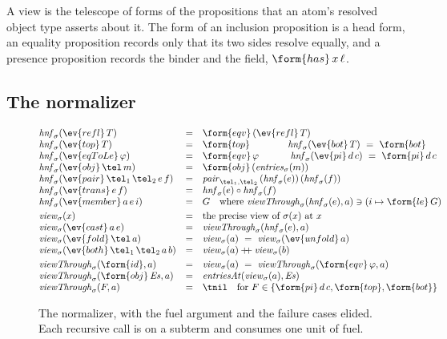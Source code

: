 A view is the telescope of forms of the propositions that an atom's resolved object type asserts about it. The form of an inclusion proposition is a head form, an equality proposition records only that its two sides resolve equally, and a presence proposition records the binder and the field, $\form{has}\,x\,\ell$.

\subsection{The normalizer}\label{sec:normalizer}

\begin{figure}
\small
\[
\begin{array}{@{}lcl@{}}
\mathit{hnf}_\sigma(\ev{refl}\,T) & = & \form{eqv}\,(\ev{refl}\,T) \\
\mathit{hnf}_\sigma(\ev{top}\,T) & = & \form{top} \qquad\qquad \mathit{hnf}_\sigma(\ev{bot}\,T) \ =\ \form{bot} \\
\mathit{hnf}_\sigma(\ev{eqToLe}\,\varphi) & = & \form{eqv}\,\varphi \qquad\quad\ \mathit{hnf}_\sigma(\ev{pi}\,d\,c) \ =\ \form{pi}\,d\,c \\
\mathit{hnf}_\sigma(\ev{obj}\,\tel\,m) & = & \form{obj}\,(\mathit{entries}_\sigma(m)) \\
\mathit{hnf}_\sigma(\ev{pair}\,\tel_1\,\tel_2\,e\,f) & = & \mathit{pair}_{\tel_1,\tel_2}\,(\mathit{hnf}_\sigma(e))\,(\mathit{hnf}_\sigma(f)) \\
\mathit{hnf}_\sigma(\ev{trans}\,e\,f) & = & \mathit{hnf}_\sigma(e) \circ \mathit{hnf}_\sigma(f) \\
\mathit{hnf}_\sigma(\ev{member}\,a\,e\,i) & = & G \quad \text{where } \mathit{viewThrough}_\sigma(\mathit{hnf}_\sigma(e), a) \ni (i \mapsto \form{le}\,G) \\[3pt]
\mathit{view}_\sigma(x) & = & \text{the precise view of } \sigma(x) \text{ at } x \\
\mathit{view}_\sigma(\ev{cast}\,a\,e) & = & \mathit{viewThrough}_\sigma(\mathit{hnf}_\sigma(e), a) \\
\mathit{view}_\sigma(\ev{fold}\,\tel\,a) & = & \mathit{view}_\sigma(a) \ =\ \mathit{view}_\sigma(\ev{unfold}\,a) \\
\mathit{view}_\sigma(\ev{both}\,\tel_1\,\tel_2\,a\,b) & = & \mathit{view}_\sigma(a) \mathbin{+\!\!+} \mathit{view}_\sigma(b) \\[3pt]
\mathit{viewThrough}_\sigma(\form{id}, a) & = & \mathit{view}_\sigma(a) \ =\ \mathit{viewThrough}_\sigma(\form{eqv}\,\varphi, a) \\
\mathit{viewThrough}_\sigma(\form{obj}\,\mathit{Es}, a) & = & \mathit{entriesAt}(\mathit{view}_\sigma(a), \mathit{Es}) \\
\mathit{viewThrough}_\sigma(F, a) & = & \tnil \quad \text{for } F \in \{\form{pi}\,d\,c, \form{top}, \form{bot}\}
\end{array}
\]
\caption{The normalizer, with the fuel argument and the failure cases elided. Each recursive call is on a subterm and consumes one unit of fuel.}
\label{fig:normalizer}
\end{figure}


